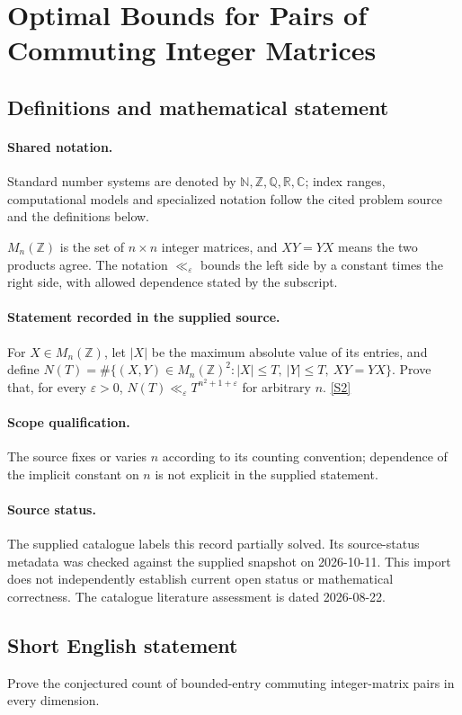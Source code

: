 \documentclass[11pt]{article}
\newcommand{\sref}[2]{\hyperlink{source:#1:#2}{[S#2]}}
\begin{document}
\section{Optimal Bounds for Pairs of Commuting Integer Matrices}\label{statement}

\subsection{Definitions and mathematical statement}

\paragraph{Shared notation.}Standard number systems are denoted by $\mathbb N,\mathbb Z,\mathbb Q,\mathbb R,\mathbb C$; index ranges, computational models and specialized notation follow the cited problem source and the definitions below.


$M_n(\mathbb Z)$ is the set of $n\times n$ integer matrices, and $XY=YX$ means the two products agree. The notation $\ll_\varepsilon$ bounds the left side by a constant times the right side, with allowed dependence stated by the subscript.
\paragraph{Statement recorded in the supplied source.}
For $X\in M_n(\mathbb{Z})$, let $|X|$ be the maximum absolute value of its entries, and define $N(T)=\#\{(X,Y)\in M_n(\mathbb{Z})^2:|X|\leq T,\ |Y|\leq T,\ XY=YX\}$. Prove that, for every $\varepsilon>0$, $N(T)\ll_\varepsilon T^{n^2+1+\varepsilon}$ for arbitrary $n$. \sref{statement}{2}
\paragraph{Scope qualification.}
The source fixes or varies $n$ according to its counting convention; dependence of the implicit constant on $n$ is not explicit in the supplied statement.
\paragraph{Source status.}
The supplied catalogue labels this record partially solved. Its source-status metadata was checked against the supplied snapshot on 2026-10-11. This import does not independently establish current open status or mathematical correctness. The catalogue literature assessment is dated 2026-08-22.
\subsection{Short English statement}
Prove the conjectured count of bounded-entry commuting integer-matrix pairs in every dimension.
\end{document}
